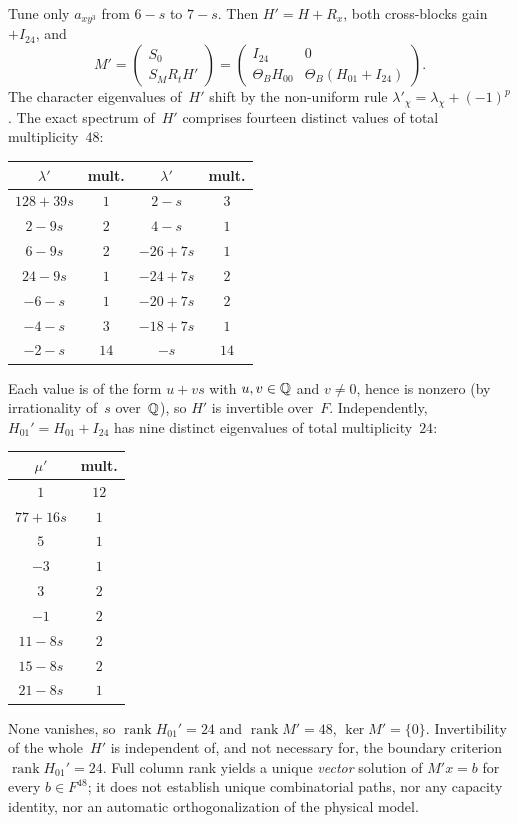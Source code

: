 \begin{theorem}\label{thm:v17-M48}
Tune only $a_{xy^3}$ from $6-s$ to $7-s$. Then $H'=H+R_x$, both cross-blocks gain $+I_{24}$, and
\[
M'=\begin{pmatrix}S_0\\ S_M R_t H'\end{pmatrix}
=\begin{pmatrix}I_{24}&0\\ \Theta_B H_{00}& \Theta_B(H_{01}+I_{24})\end{pmatrix}.
\]
The character eigenvalues of~$H'$ shift by the non-uniform rule $\lambda'_\chi=\lambda_\chi+(-1)^p$. The exact spectrum of~$H'$ comprises fourteen distinct values of total multiplicity~$48$:
\begin{center}
{\small
\begin{tabular}{@{}cc|cc@{}}
$\lambda'$ & mult. & $\lambda'$ & mult.\\
\hline
$128+39s$ & $1$ & $2-s$ & $3$\\
$2-9s$ & $2$ & $4-s$ & $1$\\
$6-9s$ & $2$ & $-26+7s$ & $1$\\
$24-9s$ & $1$ & $-24+7s$ & $2$\\
$-6-s$ & $1$ & $-20+7s$ & $2$\\
$-4-s$ & $3$ & $-18+7s$ & $1$\\
$-2-s$ & $14$ & $-s$ & $14$\\
\end{tabular}}
\end{center}
Each value is of the form $u+vs$ with $u,v\in\mathbb{Q}$ and $v\neq0$, hence is nonzero (by irrationality of~$s$ over~$\mathbb{Q}$), so $H'$ is invertible over~$F$. Independently, $H_{01}'=H_{01}+I_{24}$ has nine distinct eigenvalues of total multiplicity~$24$:
\begin{center}
{\small
\begin{tabular}{@{}cc@{}}
$\mu'$ & mult.\\
\hline
$1$ & $12$\\
$77+16s$ & $1$\\
$5$ & $1$\\
$-3$ & $1$\\
$3$ & $2$\\
$-1$ & $2$\\
$11-8s$ & $2$\\
$15-8s$ & $2$\\
$21-8s$ & $1$\\
\end{tabular}}
\end{center}
None vanishes, so $\operatorname{rank} H_{01}'=24$ and $\operatorname{rank} M'=48$, $\ker M'=\{0\}$. Invertibility of the whole~$H'$ is independent of, and not necessary for, the boundary criterion $\operatorname{rank} H_{01}'=24$. Full column rank yields a unique \emph{vector} solution of $M'x=b$ for every $b\in F^{48}$; it does not establish unique combinatorial paths, nor any capacity identity, nor an automatic orthogonalization of the physical model.
\end{theorem}
